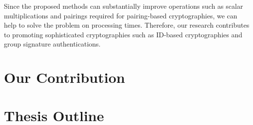 Since the proposed methods can substantially improve operations such as scalar multiplications and pairings required for pairing-based cryptographies, we can help to solve the problem on processing times.  
Therefore, our research contributes to promoting sophisticated cryptographies such as ID-based cryptographies and group signature authentications. 

\section{Our Contribution}
\label{ch1_sec_contribution}


\section{Thesis Outline}
\label{ch1_sec_outline}

